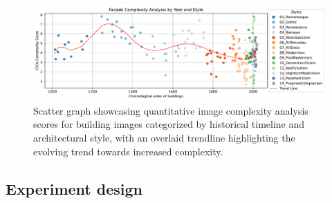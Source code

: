 \documentclass[final,5p,times]{elsarticle}%
\begin{document}
\begin{linenumbers}
            \begin{figure}[htb]
                  \centering
                  \includegraphics[width= \linewidth]{Graphs/complexitygraph}
                  \caption{Scatter graph showcasing quantitative image complexity analysis scores for building images categorized by historical timeline and architectural style, with an overlaid trendline highlighting the evolving trend towards increased complexity.}
                  \label{fig:HistoricalComplexityGraph}
            \end{figure}

    \subsection{Experiment design}
    \label{subsec:Experiment_design}
    


\end{linenumbers}
\end{document}
